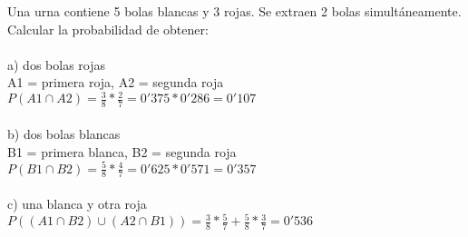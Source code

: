 
\problem
Una urna contiene 5 bolas blancas y 3 rojas. Se extraen 2 bolas simultáneamente. Calcular la probabilidad de obtener: \\ \\
\subproblem
a) dos bolas rojas \\
A1 = primera roja, A2 = segunda roja \\
$P(A1 \cap A2) = \frac{3}{8} * \frac{2}{7} = 0'375*0'286 = 0'107$ \\ \\
\subproblem
b) dos bolas blancas \\ 
B1 = primera blanca, B2 = segunda roja \\
$P(B1 \cap B2) =  \frac{5}{8} * \frac{4}{7} = 0'625 * 0'571 = 0'357$ \\ \\
\subproblem
c) una blanca y otra roja \\
$P((A1 \cap B2)\cup (A2 \cap B1)) = \frac{3}{8}*\frac{5}{7} + \frac{5}{8}*\frac{3}{7} = 0'536$ \\